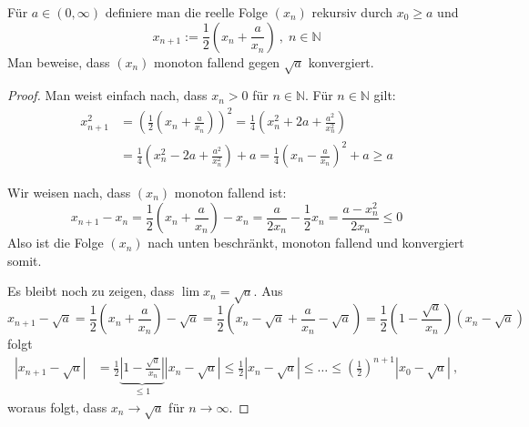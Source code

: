 \setcounter{aufgabe}{3}
\begin{aufgabe}
Für $a \in (0, \infty)$ definiere man die reelle Folge $(x_n)$ rekursiv durch $x_0 \geq a$ und
\[
x_{n+1} := \frac 1 2 \left( x_n + \frac{a}{x_n} \right) \ , \; n \in \mathbb N
\]
Man beweise, dass $(x_n)$ monoton fallend gegen $\sqrt{a}$ konvergiert.
\end{aufgabe}
\begin{proof}
Man weist einfach nach, dass $x_n > 0$ für $n \in \mathbb N$.
Für $n \in \mathbb N$ gilt:
\begin{align*}
x_{n+1}^2 &= \left( \frac 1 2 \left( x_n + \frac{a}{x_n} \right) \right)^2
	= \frac 1 4 \left( x_n^2 + 2a + \frac{a^2}{x_n^2} \right) \\
	&= \frac 1 4 \left( x_n^2 - 2a  + \frac{a^2}{x_n^2} \right) + a 
	= \frac 1 4 \left( x_n - \frac{a}{x_n} \right)^2 + a \geq a
\end{align*}

Wir weisen nach, dass $(x_n)$ monoton fallend ist:
\[
x_{n+1} - x_n = \frac 1 2 \left( x_n + \frac{a}{x_n} \right) - x_n
	= \frac{a}{2x_n} - \frac 1 2 x_n = \frac{a - x_n^2}{2 x_n} \leq 0
\]
Also ist die Folge $(x_n)$ nach unten beschränkt, monoton fallend und konvergiert somit.

Es bleibt noch zu zeigen, dass $\lim x_n = \sqrt{a}$.
Aus 
\[
x_{n+1} - \sqrt{a}
	= \frac 1 2 \left( x_n + \frac{a}{x_n} \right) - \sqrt{a}
	= \frac 1 2 \left( x_n - \sqrt{a} + \frac{a}{x_n} - \sqrt{a} \right)
	= \frac 1 2 \left( 1 - \frac{\sqrt{a}}{x_n} \right) \left( x_n - \sqrt{a} \right)
\]
folgt
\begin{align*}
| x_{n+1} - \sqrt{a} |
	&= \frac 1 2 \underbrace{ \left| 1 - \frac{\sqrt{a}}{x_n} \right| }_{\leq 1}
	\left| x_n - \sqrt{a} \right|
	\leq \frac 1 2 | x_n - \sqrt{a} |
	\leq \ldots \leq \left( \frac 1 2 \right)^{n+1} | x_0 - \sqrt{a} | \ ,
\end{align*}
woraus folgt, dass $x_n \to \sqrt{a}$ für $n \to \infty$.

\end{proof}


